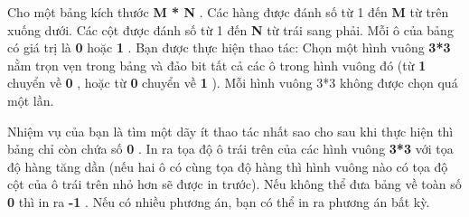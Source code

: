 Cho một bảng kích thước   \textbf{    M * N   }   . Các hàng được đánh số từ 1 đến   \textbf{    M   }   từ trên xuống dưới. Các cột được đánh số từ 1 đến   \textbf{    N   }   từ trái sang phải. Mỗi ô của bảng có giá trị là   \textbf{    0   }   hoặc   \textbf{    1   }   . Bạn được thực hiện thao tác: Chọn một hình vuông   \textbf{    3*3   }   nằm trọn vẹn trong bảng và đảo bit tất cả các ô trong hình vuông đó (từ   \textbf{    1   }   chuyển về   \textbf{    0   }   , hoặc từ   \textbf{    0   }   chuyển về   \textbf{    1   }   ). Mỗi hình vuông 3*3 không được chọn quá một lần.  

   Nhiệm vụ của bạn là tìm một dãy ít thao tác nhất sao cho sau khi thực hiện thì bảng chỉ còn chứa số   \textbf{    0   }   . In ra tọa độ ô trái trên của các hình vuông   \textbf{    3*3   }   với tọa độ hàng tăng dần (nếu hai ô có cùng tọa độ hàng thì hình vuông nào có tọa độ cột của ô trái trên nhỏ hơn sẽ được in trước). Nếu không thể đưa bảng về toàn số   \textbf{    0   }   thì in ra   \textbf{    -1   }   . Nếu có nhiều phương án, bạn có thể in ra phương án bất kỳ.